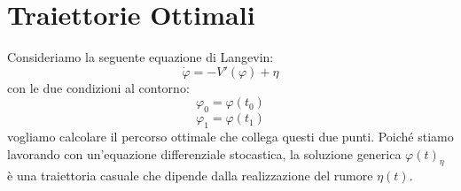 \section{Traiettorie Ottimali}
Consideriamo la seguente equazione di Langevin:
\begin{equation} 
\dot{\varphi}=-V'(\varphi)+\eta 
\end{equation}
con le due condizioni al contorno:
\begin{equation}
\varphi_{0}=\varphi(t_{0})
\end{equation}
\begin{equation}
\varphi_{1}=\varphi(t_{1})
\end{equation}
vogliamo calcolare il percorso ottimale che collega questi due punti.
Poiché stiamo lavorando con un'equazione differenziale stocastica, la soluzione generica $\varphi(t)_{\eta}$ è una traiettoria casuale che dipende dalla realizzazione del rumore $\eta(t)$.

